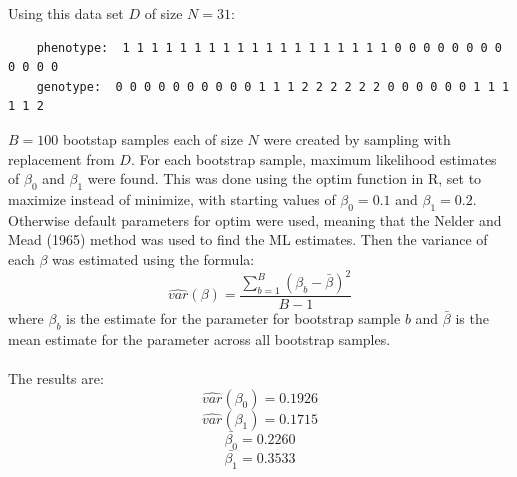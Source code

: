 \documentclass{article}
\begin{document}
	Using this data set $D$ of size $N = 31$:
	\begin{verbatim}
	phenotype:	1 1 1 1 1 1 1 1 1 1 1 1 1 1 1 1 1 1 1 0 0 0 0 0 0 0 0 0 0 0 0
	genotype:  0 0 0 0 0 0 0 0 0 0 1 1 1 2 2 2 2 2 2 0 0 0 0 0 0 1 1 1 1 1 2
	\end{verbatim}	
	$B = 100$ bootstap samples each of size $N$ were created by sampling with replacement from $D$. For each bootstrap sample, maximum likelihood estimates of $\beta_0$ and $\beta_1$ were found. This was done using the optim function in R, set to maximize instead of minimize, with starting values of $\beta_0 = 0.1$ and $\beta_1 = 0.2$. Otherwise default parameters for optim were used, meaning that the Nelder and Mead (1965) method was used to find the ML estimates. Then the variance of each $\beta$ was estimated using the formula:
	\[\hat{var}(\beta) = \frac{\sum^{B}_{b=1}(\beta_b - \bar{\beta})^2}{B - 1}\] 
	where $\beta_b$ is the estimate for the parameter for bootstrap sample $b$ and $\bar{\beta}$ is the mean estimate for the parameter across all bootstrap samples.
	
	\paragraph{}The results are:
	\[\hat{var}(\beta_0) = 0.1926\]
	\[\hat{var}(\beta_1) = 0.1715\]
	\[\bar{\beta_0} = 0.2260\]
	\[\bar{\beta_1} = 0.3533\]
	
\end{document}
